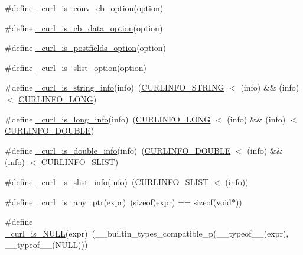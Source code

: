 \begin{DoxyCompactItemize}
\#define \hyperlink{typecheck-gcc_8h_a084944a41877f383164cdf0948be6a77}{\+\_\+curl\+\_\+is\+\_\+conv\+\_\+cb\+\_\+option}(option)
\item 
\#define \hyperlink{typecheck-gcc_8h_ab5e9dc6fafd6cce2e360fd41926cbbb6}{\+\_\+curl\+\_\+is\+\_\+cb\+\_\+data\+\_\+option}(option)
\item 
\#define \hyperlink{typecheck-gcc_8h_a219ab470b025e5855351c8f724d4d053}{\+\_\+curl\+\_\+is\+\_\+postfields\+\_\+option}(option)
\item 
\#define \hyperlink{typecheck-gcc_8h_abd91cfa02052fdf27f2d2278480f2601}{\+\_\+curl\+\_\+is\+\_\+slist\+\_\+option}(option)
\item 
\#define \hyperlink{typecheck-gcc_8h_abc3d0fb5cacf1e53fd1767653fdcd0db}{\+\_\+curl\+\_\+is\+\_\+string\+\_\+info}(info)~(\hyperlink{curl_8h_a2df6a052fcaceae309702c24d19ce5f5}{C\+U\+R\+L\+I\+N\+F\+O\+\_\+\+S\+T\+R\+I\+NG} $<$ (info) \&\& (info) $<$ \hyperlink{curl_8h_ad7be151454940ae2241677a25623ff4d}{C\+U\+R\+L\+I\+N\+F\+O\+\_\+\+L\+O\+NG})
\item 
\#define \hyperlink{typecheck-gcc_8h_adc6e9332b579cdab463112cf9a66c403}{\+\_\+curl\+\_\+is\+\_\+long\+\_\+info}(info)~(\hyperlink{curl_8h_ad7be151454940ae2241677a25623ff4d}{C\+U\+R\+L\+I\+N\+F\+O\+\_\+\+L\+O\+NG} $<$ (info) \&\& (info) $<$ \hyperlink{curl_8h_a363ca12d0c8bf659e5464e4b04b8606c}{C\+U\+R\+L\+I\+N\+F\+O\+\_\+\+D\+O\+U\+B\+LE})
\item 
\#define \hyperlink{typecheck-gcc_8h_a82d678e9c71e7c6fb9a0eb798eba3eea}{\+\_\+curl\+\_\+is\+\_\+double\+\_\+info}(info)~(\hyperlink{curl_8h_a363ca12d0c8bf659e5464e4b04b8606c}{C\+U\+R\+L\+I\+N\+F\+O\+\_\+\+D\+O\+U\+B\+LE} $<$ (info) \&\& (info) $<$ \hyperlink{curl_8h_a49a110fda25ca4982e67a0c547f0826c}{C\+U\+R\+L\+I\+N\+F\+O\+\_\+\+S\+L\+I\+ST})
\item 
\#define \hyperlink{typecheck-gcc_8h_ae64e7d84fcc0a5f297e7cd11f4003694}{\+\_\+curl\+\_\+is\+\_\+slist\+\_\+info}(info)~(\hyperlink{curl_8h_a49a110fda25ca4982e67a0c547f0826c}{C\+U\+R\+L\+I\+N\+F\+O\+\_\+\+S\+L\+I\+ST} $<$ (info))
\item 
\#define \hyperlink{typecheck-gcc_8h_a6262734b3ea5822848f25ead84674736}{\+\_\+curl\+\_\+is\+\_\+any\+\_\+ptr}(expr)~(sizeof(expr) == sizeof(void$\ast$))
\item 
\#define \hyperlink{typecheck-gcc_8h_a62558ae8dab69bab5b9267e95ffc1991}{\+\_\+curl\+\_\+is\+\_\+\+N\+U\+LL}(expr)~(\+\_\+\+\_\+builtin\+\_\+types\+\_\+compatible\+\_\+p(\+\_\+\+\_\+typeof\+\_\+\+\_\+(expr), \+\_\+\+\_\+typeof\+\_\+\+\_\+(N\+U\+LL)))
\item 

\end{DoxyCompactItemize}
